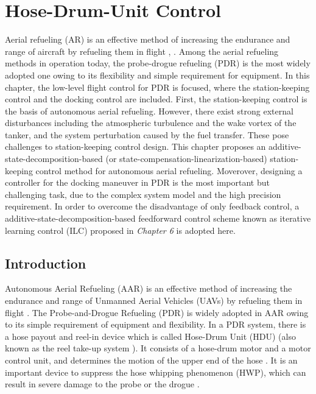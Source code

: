 
\chapter{Hose-Drum-Unit Control}

Aerial refueling (AR) is an effective method of increasing the endurance and
range of aircraft by refueling them in flight \cite{AAR-2014},
\cite{luo2019docking}. Among the aerial refueling methods in operation today,
the probe-drogue refueling (PDR) \cite{bhandari2013bow} is the most widely
adopted one owing to its flexibility and simple requirement for equipment. In
this chapter, the low-level flight control for PDR is focused, where the
station-keeping control and the docking control are included. First,
the station-keeping control is the basis of autonomous aerial refueling. However,
there exist strong external disturbances including the atmospheric turbulence
and the wake vortex of the tanker, and the system perturbation caused by the fuel
transfer. These pose challenges to station-keeping control design. This
chapter proposes an additive-state-decomposition-based (or state-compensation-linearization-based) station-keeping control
method for autonomous aerial refueling. Moverover, designing a controller for
the docking maneuver in PDR is the most important but challenging task, due to
the complex system model and the high precision requirement. In order to
overcome the disadvantage of only feedback control, a additive-state-decomposition-based feedforward control
scheme known as iterative learning control (ILC) proposed in \textit{Chapter 6} is adopted here.

\section{Introduction}

Autonomous Aerial Refueling (AAR) is an effective method of increasing
the endurance and range of Unmanned Aerial Vehicles (UAVs) \cite{lee2017optimal,olavo2018robust,roberge2018fast}
by refueling them in flight \cite{Thomas2014}. The Probe-and-Drogue
Refueling (PDR) is widely adopted in AAR owing to its simple requirement
of equipment and flexibility. In a PDR system, there is a hose payout
and reel-in device which is called Hose-Drum Unit (HDU) \cite{Ro2011}
(also known as the reel take-up system \cite{Vassberg2003,vassberg2005numerical}).
It consists of a hose-drum motor and a motor control unit, and determines
the motion of the upper end of the hose \cite{Ro2011}. It is an important
device to suppress the hose whipping phenomenon (HWP), which can result
in severe damage to the probe or the drogue \cite{Wang2014}.

